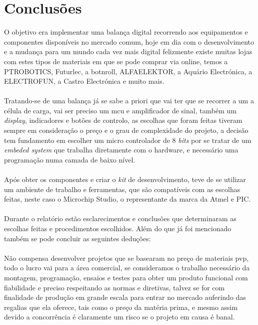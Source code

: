 \chapter{Conclusões}
O objetivo era implementar uma balança digital recorrendo aos equipamentos e componentes disponíveis no mercado comum, hoje em dia com o desenvolvimento e a mudança para um mundo cada vez mais digital felizmente existe muitas lojas com estes tipos de materiais em que se pode comprar via online, temos a PTROBOTICS, Futurlec, a botnroll, ALFAELEKTOR, a Aquário Electrónica, a ELECTROFUN, a Castro Electrónica e muito mais.
\\
\\
Tratando-se de uma balança já se sabe a priori que vai ter que se recorrer a um a célula de carga, vai ser preciso um \acs{mcu} e amplificador de sinal, também um \textit{display}, indicadores e botões de controlo, as escolhas que foram feitas tiveram sempre em consideração o preço e o grau de complexidade do projeto, a decisão tem fundamento em escolher um micro controlador de 8 \textit{bits} por se tratar de um \textit{embeded system} que trabalha diretamente com o hardware, e necessário uma programação numa camada de baixo nível.
\\
\\
Após obter os componentes e criar o \textit{kit} de desenvolvimento, teve de se utilizar um ambiente de trabalho e ferramentas, que são compatíveis com as escolhas feitas, neste caso o Microchip Studio, o representante da marca da Atmel e PIC.
\\
\\
Durante o relatório estão esclarecimentos e conclusões que determinaram as escolhas feitas e procedimentos escolhidos. Além do que já foi mencionado também se pode concluir as seguintes deduções:
\\
\\
Não compensa desenvolver projetos que se basearam no preço de materiais \ac{pvp}, todo o lucro vai para a área comercial, se consideramos o trabalho necessário da montagem, programação, ensaios e testes para obter um produto funcional com fiabilidade e preciso respeitando as normas e diretivas, talvez se for com finalidade de produção em grande escala para entrar no mercado auferindo das regalias que ela oferece, tais como o preço da matéria prima, e mesmo assim devido a concorrência é claramente um risco se o projeto em causa é banal.
